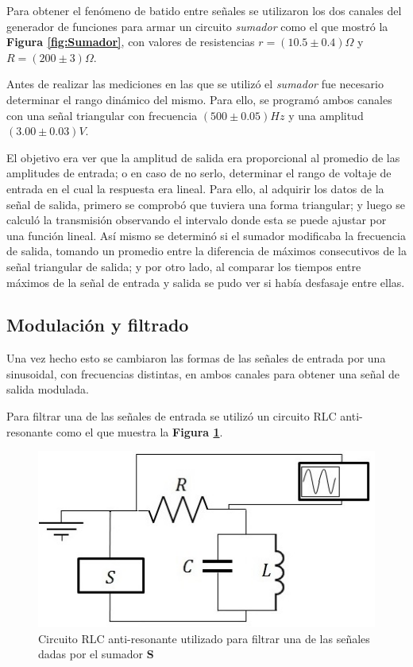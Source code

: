 \documentclass[11pt,a4paper]{article}
\begin{document}
Para obtener el fenómeno de batido entre señales se utilizaron los dos canales del generador de funciones para armar un circuito \textit{sumador} como el que mostró la \textbf{Figura \ref{fig:Sumador}}, con valores de resistencias $r=(10.5 \pm 0.4)\Omega$ y $R=(200 \pm 3)\Omega$.

Antes de realizar las mediciones en las que se utilizó el \textit{sumador} fue necesario determinar el rango dinámico del mismo. Para ello, se programó ambos canales con una señal triangular con frecuencia $(500 \pm 0.05) Hz$ y una amplitud $(3.00 \pm 0.03)V$.

El objetivo era ver que la amplitud de salida era proporcional al promedio de las amplitudes de entrada; o en caso de no serlo, determinar el rango de voltaje de entrada en el cual la respuesta era lineal. Para ello, al adquirir los datos de la señal de salida, primero se comprobó que tuviera una forma triangular; y luego se calculó la transmisión observando el intervalo donde esta se puede ajustar por una función lineal. Así mismo se determinó si el sumador modificaba la frecuencia de salida, tomando un promedio entre la diferencia de máximos consecutivos de la señal triangular de salida; y por otro lado, al comparar los tiempos entre máximos de la señal de entrada y salida se pudo ver si había desfasaje entre ellas. 

\subsection{Modulación y filtrado}
Una vez hecho esto se cambiaron las formas de las señales de entrada por una sinusoidal, con frecuencias distintas, en ambos canales para obtener una señal de salida modulada.

Para filtrar una de las señales de entrada se utilizó un circuito RLC anti-resonante como el que muestra la \textbf{Figura \ref{fig:filtro}}. 

\begin{figure}[h]
\centering
\includegraphics[scale=0.65]{filtro}
\caption{Circuito RLC anti-resonante utilizado para filtrar una de las señales dadas por el sumador \textbf{S}}
\label{fig:filtro}
\end{figure}
\end{document}
